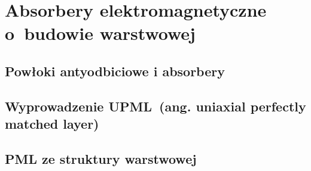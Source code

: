 \chapter{Absorbery elektromagnetyczne o~budowie warstwowej}
\label{roz:pml}

\section{Powłoki antyodbiciowe i absorbery}

\section{Wyprowadzenie UPML~(ang. uniaxial perfectly matched layer)}

\section{PML ze struktury warstwowej}

